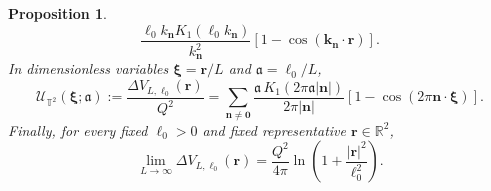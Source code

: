 \documentclass[nopacs,amsmath,amsfonts,amssymb,aps,superscriptaddress]{revtex4}
\newtheorem{proposition}{Proposition}[section]
\begin{document}
\begin{proposition}
\begin{equation}
\frac{\ell_0 k_{\mathbf n}K_1(\ell_0 k_{\mathbf n})}{k_{\mathbf n}^2}
\left[1-\cos(\mathbf k_{\mathbf n}\cdot\mathbf r)\right].
\end{equation}
In dimensionless variables \(\boldsymbol{\xi}=\mathbf r/L\) and \(\mathfrak a=\ell_0/L\),
\begin{equation}\label{Uax}
  \mathcal U_{\mathbb T^2}(\boldsymbol{\xi};\mathfrak a):=\frac{\Delta V_{L,\ell_0}(\mathbf r)}{Q^2}
  =\sum_{\mathbf n\neq\mathbf 0}
  \frac{\mathfrak a\,K_1(2\pi\mathfrak a|\mathbf n|)}{2\pi|\mathbf n|}
  \left[1-\cos(2\pi\mathbf n\cdot\boldsymbol{\xi})\right].
\end{equation}
Finally, for every fixed \(\ell_0>0\) and fixed representative \(\mathbf r\in\mathbb R^2\),
\begin{equation}
  \lim_{L\to\infty}\Delta V_{L,\ell_0}(\mathbf r)
  =\frac{Q^2}{4\pi}\ln\left(1+\frac{|\mathbf r|^2}{\ell_0^2}\right).
\end{equation}
\end{proposition}
\end{document}
